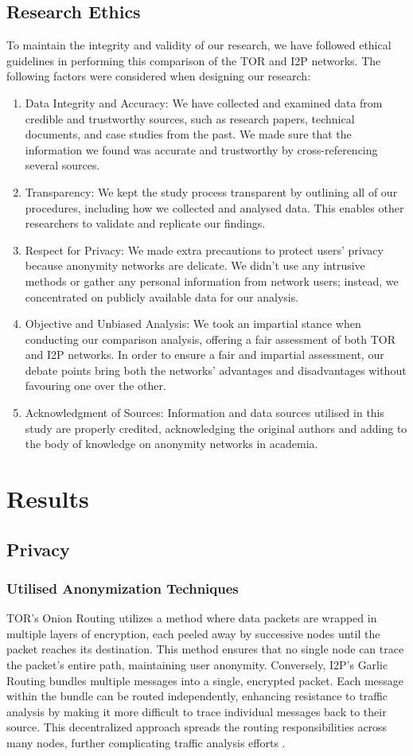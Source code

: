 \documentclass[12pt,conference]{IEEEtran}
\begin{document}
\subsection{Research Ethics}
To maintain the integrity and validity of our research, we have followed ethical guidelines in performing this comparison of the TOR and I2P networks. The following factors were considered when designing our research: 
\begin{enumerate}
	\item Data Integrity and Accuracy: We have collected and examined data from credible and trustworthy sources, such as research papers, technical documents, and case studies from the past. We made sure that the information we found was accurate and trustworthy by cross-referencing several sources.
	\item Transparency: We kept the study process transparent by outlining all of our procedures, including how we collected and analysed data. This enables other researchers to validate and replicate our findings.
	\item Respect for Privacy: We made extra precautions to protect users' privacy because anonymity networks are delicate. We didn't use any intrusive methods or gather any personal information from network users; instead, we concentrated on publicly available data for our analysis.
	\item Objective and Unbiased Analysis: We took an impartial stance when conducting our comparison analysis, offering a fair assessment of both TOR and I2P networks. In order to ensure a fair and impartial assessment, our debate points bring both the networks' advantages and disadvantages without favouring one over the other.
	\item Acknowledgment of Sources:  Information and data sources utilised in this study are properly credited, acknowledging the original authors and adding to the body of knowledge on anonymity networks in academia.
\end{enumerate}
\section{Results}
\subsection{Privacy}
\subsubsection{Utilised Anonymization Techniques}
TOR's Onion Routing utilizes a method where data packets are wrapped in multiple layers of encryption, each peeled away by successive nodes until the packet reaches its destination. This method ensures that no single node can trace the packet's entire path, maintaining user anonymity. Conversely, I2P's Garlic Routing bundles multiple messages into a single, encrypted packet. Each message within the bundle can be routed independently, enhancing resistance to traffic analysis by making it more difficult to trace individual messages back to their source. This decentralized approach spreads the routing responsibilities across many nodes, further complicating traffic analysis efforts \cite{aSurveyOnTORAndI2P}\cite{TORVsI2P}\cite{torAttacks}.
\end{document}
